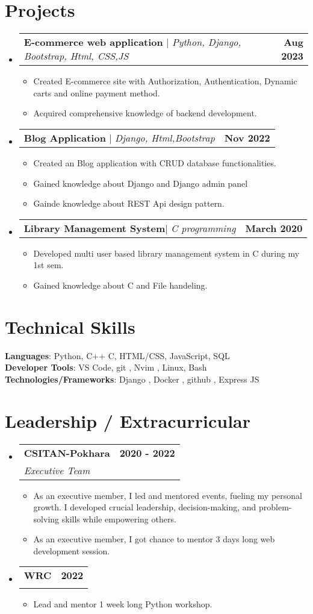\documentclass[letterpaper,11pt]{article}
\makeatletter
\newcommand{\resumeItem}[1]{
  \item\small{
    {#1 \vspace{-2pt}}
  }
}
\newcommand{\resumeSubheading}[4]{
  \vspace{-2pt}\item
    \begin{tabular*}{1.0\textwidth}[t]{l@{\extracolsep{\fill}}r}
      \textbf{#1} & \textbf{\small #2} \\
      \textit{\small#3} & \textit{\small #4} \\
    \end{tabular*}\vspace{-7pt}
}
\newcommand{\resumeProjectHeading}[2]{
    \item
    \begin{tabular*}{1.001\textwidth}{l@{\extracolsep{\fill}}r}
      \small#1 & \textbf{\small #2}\\
    \end{tabular*}\vspace{-7pt}
}
\newcommand{\resumeSubHeadingListStart}{\begin{itemize}[leftmargin=0.0in, label={}]}
\newcommand{\resumeSubHeadingListEnd}{\end{itemize}}
\newcommand{\resumeItemListStart}{\begin{itemize}}
\newcommand{\resumeItemListEnd}{\end{itemize}\vspace{-5pt}}
\makeatother
\begin{document}
\section{Projects}
    \vspace{-5pt}
    \resumeSubHeadingListStart
      \resumeProjectHeading
          {\textbf{E-commerce web application} $|$ \emph{Python, Django, Bootstrap, Html, CSS,JS}}{Aug 2023}
          \resumeItemListStart
          \resumeItem{Created E-commerce site with     Authorization, Authentication, Dynamic carts and online payment method.}
            \resumeItem{Acquired comprehensive knowledge of backend development.}
          \resumeItemListEnd
          \vspace{-13pt}
      \resumeProjectHeading
          {\textbf{Blog Application} $|$ \emph{Django, Html,Bootstrap}}{Nov 2022}
          \resumeItemListStart
            \resumeItem{Created an Blog application with CRUD database functionalities.}
            \resumeItem{Gained knowledge about Django and Django admin panel}
            \resumeItem{Gainde knowledge about REST Api design pattern.}
          \resumeItemListEnd 
          \vspace{-13pt}
          \resumeProjectHeading
          {\textbf{Library Management System}$|$ \emph{C programming}}{March 2020}
          \resumeItemListStart
            \resumeItem{Developed multi user based library management system in C
during my 1st sem.
}
\resumeItem{Gained knowledge about C and File handeling.}
          \resumeItemListEnd 
    \resumeSubHeadingListEnd
\vspace{-15pt}


%
\section{Technical Skills}
 \begin{itemize}[leftmargin=0.15in, label={}]
    \small{\item{
     \textbf{Languages}{: Python, C++ C, HTML/CSS, JavaScript, SQL} \\
     \textbf{Developer Tools}{: VS Code, git , Nvim , Linux, Bash} \\
     \textbf{Technologies/Frameworks}{: Django , Docker , github , Express JS} \\
    }}
 \end{itemize}
 \vspace{-16pt}


\section{Leadership / Extracurricular}
    \resumeSubHeadingListStart
        \resumeSubheading{CSITAN-Pokhara}{2020 - 2022}{Executive Team}{}
            \resumeItemListStart
                \resumeItem{ As an executive member, I led and mentored events, fueling my personal growth. I developed crucial leadership, decision-making, and problem-solving skills while empowering others.}
                \resumeItem{As an executive member, I got chance to mentor 3 days long web development session.}
            
            \resumeItemListEnd
        \resumeSubheading{WRC}{2022}{}{}
            \resumeItemListStart
                \resumeItem{ Lead and mentor 1 week long Python workshop.}
                
            \resumeItemListEnd
        
    \resumeSubHeadingListEnd
\end{document}

